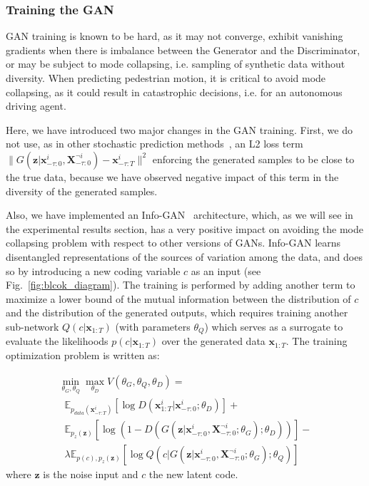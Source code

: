 \documentclass[10pt,twocolumn,letterpaper]{article}
\begin{document}
\subsubsection{Training the GAN}

GAN training is known to be hard, as it may not converge, exhibit vanishing gradients when there is imbalance between the Generator and the Discriminator, or may be subject to mode collapsing, i.e. sampling of synthetic data without diversity. When predicting pedestrian motion, it is critical to avoid mode collapsing, as it could result in catastrophic decisions, i.e. for an autonomous driving agent.

Here, we have introduced two major changes in the GAN training. First, we do not use, as in other stochastic prediction methods~\cite{SocialGAN2018, SoPhie2018}, an L2 loss term $\|G(\mathbf{z}|\mathbf{x}^i_{-\tau: 0},\mathbf{X}^{\neg i}_{-\tau: 0})-\mathbf{x}^i_{-\tau:T}\|^2$ enforcing the generated samples to be close to the true data, because we have observed negative impact of this term in the diversity of the generated samples. 



Also, we have implemented an Info-GAN~\cite{Infogan2016} architecture, which, as we will see in the experimental results section, has a very positive impact on avoiding the mode collapsing problem with respect to other versions of GANs. Info-GAN learns disentangled representations of the sources of variation among the data, and does so by introducing a new coding variable $c$ as an input (see Fig.~\ref{fig:blcok_diagram}). The training is performed by adding another term to maximize a lower bound of the mutual information between the distribution of $c$ and the distribution of the generated outputs, which requires training another sub-network $Q(c|\mathbf x_{1:T})$ (with parameters $\theta_Q$) which serves as a surrogate to evaluate the likelihoods $p(c|\mathbf x_{1:T})$ over the generated data $\mathbf x_{1:T}$. The training optimization problem is written as:
	
{\small   
\begin{equation}
\begin{array}{l}
\min_{\theta_G,\theta_Q}\max_{\theta_D} V(\theta_G,\theta_Q,\theta_D)= \\
\;\;\mathbb{E}_{p_{data}(\mathbf{x}^i_{-\tau:T})}[\log D(\mathbf{x}^i_{1:T}|\mathbf{x}^i_{-\tau: 0};\theta_D)]+\\
\;\;\mathbb{E}_{p_z(\mathbf{z})}[\log(1-D(G(\mathbf{z}|\mathbf{x}^i_{-\tau: 0},\mathbf{X}^{\neg i}_{-\tau: 0};\theta_G);\theta_D))]-\\
\;\;\lambda \mathbb{E}_{p(c),p_z(\mathbf{z})}[\log Q(c|G(\mathbf z|\mathbf{x}^i_{-\tau: 0},\mathbf{X}^{\neg i}_{-\tau: 0};\theta_G);\theta_Q)] \label{eq:infoganloss}
\end{array}
\end{equation}}
where $\mathbf{z}$ is the noise input and $c$ the new latent code.
\end{document}
